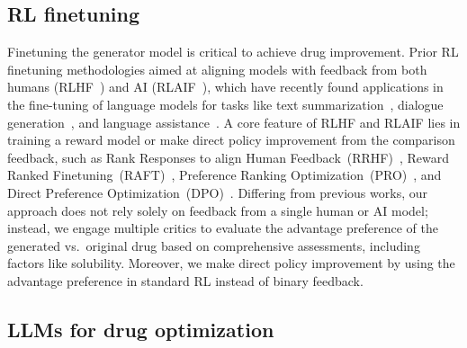 \subsection{RL finetuning}
{Finetuning the generator model is critical to achieve drug improvement.
Prior RL finetuning methodologies aimed at aligning models with feedback from both humans (RLHF~\citep{bai2022training,christiano2017deep, ibarz2018reward,touvron2023llama}) and AI (RLAIF~\citep{bai2022constitutional,leike2018scalable}), which have recently found applications in the fine-tuning of language models for tasks like text summarization~\citep{ bohm2019better, stiennon2020learning, wu2021recursively, ziegler2019fine}, dialogue generation~\citep{hancock2019learning, jaques2019way,  yi2019towards}, 
and language assistance~\citep{bai2022training}. 
A core feature of RLHF and RLAIF lies in training a reward model {or make direct policy improvement} from the comparison feedback, {such as Rank Responses to align Human Feedback~(RRHF)~\citep{yuan2023rrhf}, Reward Ranked Finetuning~(RAFT)~\citep{dong2023raft}, Preference Ranking Optimization~(PRO)~\citep{song2023preference}, and Direct Preference Optimization~(DPO)~\citep{rafailov2023direct}.}}
Differing from previous works, our approach does not rely solely on feedback from a single human or AI model; instead, we engage multiple critics to evaluate the advantage preference of the generated vs.\ original drug based on comprehensive assessments, including factors like solubility. 
Moreover, we make direct policy improvement by using the advantage preference {in standard RL} {instead of binary feedback}.

























\subsection{{LLMs for drug optimization}}


